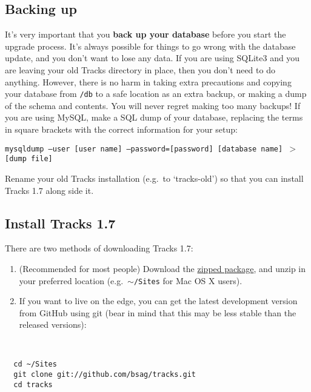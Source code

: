 \documentclass[10pt,twoside]{memoir}
\begin{document}
\subsection{Backing up}
\label{backup_upgrade}

It's very important that you \textbf{back up your database} before you start the upgrade process. It's always possible for things to go wrong with the database update, and you don't want to lose any data. If you are using SQLite3 and you are leaving your old Tracks directory in place, then you don't need to do anything. However, there is no harm in taking extra precautions and copying your database from \texttt{/db} to a safe location as an extra backup, or making a dump of the schema and contents. You will never regret making too many backups! If you are using MySQL, make a SQL dump of your database, replacing the terms in square brackets with the correct information for your setup:


\texttt{mysqldump ---user [user name] ---password=[password] [database name] $>$ [dump file]}


Rename your old Tracks installation (e.g.\ to `tracks-old') so that you can install Tracks 1.7 along side it.


\subsection{Install Tracks 1.7}
\label{install_upgrade}

There are two methods of downloading Tracks 1.7:


\begin{enumerate}


\item (Recommended for most people) Download the \href{http://www.rousette.org.uk/projects/files/tracks-current.zip}{zipped package}, and unzip in your preferred location (e.g.\ \texttt{\ensuremath{\sim}/Sites} for Mac OS X users).

\item If you want to live on the edge, you can get the latest development version from GitHub using git (bear in mind that this may be less stable than the released versions):
\end{enumerate}

\begin{adjustwidth}{2.5em}{2.5em}
\begin{verbatim}


  cd ~/Sites
  git clone git://github.com/bsag/tracks.git
  cd tracks


\end{verbatim}
\end{adjustwidth}
\end{document}
